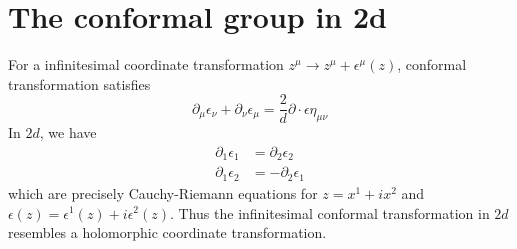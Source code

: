 \section{The conformal group in 2d}
For a infinitesimal coordinate transformation $z^\mu \rightarrow z^\mu + \epsilon^\mu(z)$, conformal transformation satisfies 
\begin{equation}
	\partial_\mu \epsilon_\nu + \partial_\nu \epsilon_\mu  = \frac{2}{d} \partial \cdot \epsilon \eta_{\mu\nu}
\end{equation}
In $2d$, we have
\begin{align*}
	\partial_1 \epsilon_1 &= \partial_2 \epsilon_2 \\
	\partial_1 \epsilon_2 &= - \partial_2 \epsilon_1
\end{align*}
which are precisely Cauchy-Riemann equations for $z = x^1 + ix^2$ and $\epsilon(z) = \epsilon^1(z) + i \epsilon^2(z)$. Thus the infinitesimal conformal transformation in $2d$ resembles a holomorphic coordinate transformation.
